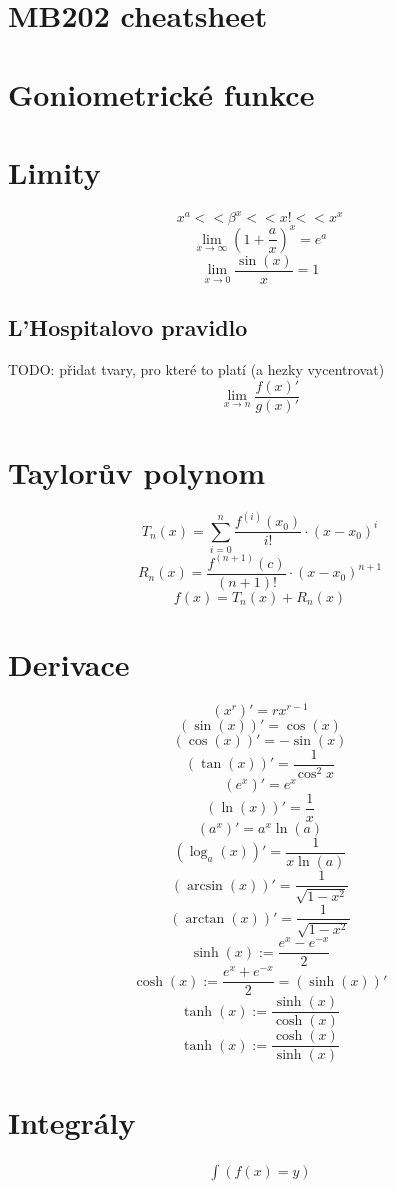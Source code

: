 \documentclass[a4paper]{article}
\begin{document}
\section*{MB202 cheatsheet}

\begin{multicols}{2}
    \section*{Goniometrické funkce}
    \section*{Limity}
        \[ {x}^a << {\beta}^x << x! << {x}^x \]
        \[ \lim_{x \rightarrow \infty} {(1 + \frac{a}{x})}^x = e^a \]
        \[ \lim_{x \rightarrow 0} {\frac{\sin(x)}{x} = 1} \]
        \subsection*{L'Hospitalovo pravidlo}
            TODO\@: přidat tvary, pro které to platí (a hezky vycentrovat)
            \[  \lim_{x \rightarrow n} \frac{f(x)'}{g(x)'} \]    
    \section*{Taylorův polynom}
        \[ T_n(x) = \sum_{i=0}^{n} \frac{f^{(i)}(x_0)}{i!}\cdot{(x - x_0)}^i \]
        \[ R_n(x) = \frac{f^{(n+1)}(c)}{(n+1)!}\cdot{(x - x_0)}^{n+1} \]
        \[ f(x) = T_n(x) + R_n(x) \]
    \section*{Derivace}
        \[ ({x}^r)' = {rx}^{r-1} \]
        \[ (\sin(x))' = \cos(x) \]
        \[ (\cos(x))' = -\sin(x) \]
        \[ (\tan(x))' = \frac{1}{{\cos}^2 x} \]
        \[ (e^x)' = e^x \]
        \[ (\ln(x))' = \frac{1}{x} \]
        \[ (a^x)' = a^x \ln(a) \]
        \[ (\log_a(x))' = \frac{1}{x\ln(a)} \]
        \[ (\arcsin(x))' = \frac{1}{\sqrt{1-x^2}} \]
        \[ (\arctan(x))' = \frac{1}{\sqrt{1-x^2}} \]
        \[ \sinh(x):= \frac{e^x - e^{-x}}{2} \]
        \[ \cosh(x) := \frac{e^x + e^{-x}}{2} = (\sinh(x))' \]
        \[ \tanh(x) := \frac{\sinh(x)}{\cosh(x)}\]
        \[ \tanh(x) := \frac{\cosh(x)}{\sinh(x)}\]
    \section*{Integrály}
    \begin{align*}
        \int(f(x)=y)
    \end{align*}
\end{multicols}
\end{document}
